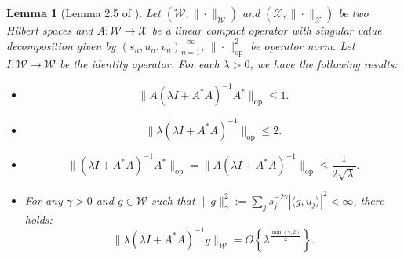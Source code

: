 \documentclass[
  12pt]{article}
\newtheorem{lemma}{Lemma}
\def\to{\rightarrow}
\def\cW{\mathcal{W}}
\def\cX{\mathcal{X}}
\begin{document}
\begin{lemma}[Lemma 2.5 of \cite{beyhum2024testing}]\label{Lemm: Bounds on Compact Operator}
Let $(\mathcal{W},\|\cdot\|_{\cW})$ and $(\mathcal{X},\|\cdot\|_{\cX})$ be two Hilbert spaces and $A:\mathcal{W}\to \mathcal{X} $ be a linear compact operator with singular value decomposition given by $(s_n,u_n,v_{n})_{n=1}^{+\infty}$, $\|\cdot\|_{\mathrm{op}}^2$ be operator norm. Let $I: \cW \to \cW$ be the identity operator. For each $\lambda > 0$, we have the following results:
\begin{itemize}
    \item[(a)] $$\|A(\lambda I + A^*A)^{-1}A^*\|_{\mathrm{op}}\leq 1. $$
    \item[(b)] $$\|\lambda(\lambda I + A^*A)^{-1}\|_{\mathrm{op}}\leq 2. $$
    \item[(c)] $$\|(\lambda I + A^*A )^{-1}A^* \|_{\mathrm{op}}=\|A(\lambda I + A^*A )^{-1} \|_{\mathrm{op}}\leq \frac{1}{2\sqrt{\lambda}}.$$
    \item[(d)] For any $\gamma > 0$ and $g \in \cW$ such that $\|g\|_\gamma^2:=\sum_j s_j^{-2\gamma}|\langle g,u_j\rangle|^2<\infty$, there holds: 
    $$
    \|\lambda(\lambda I + A^*A)^{-1}g\|_{\cW}=O\left\{\lambda^{\frac{\min(\gamma,2)}{2}} \right\}.
    $$
\end{itemize} 
\end{lemma}
\end{document}
